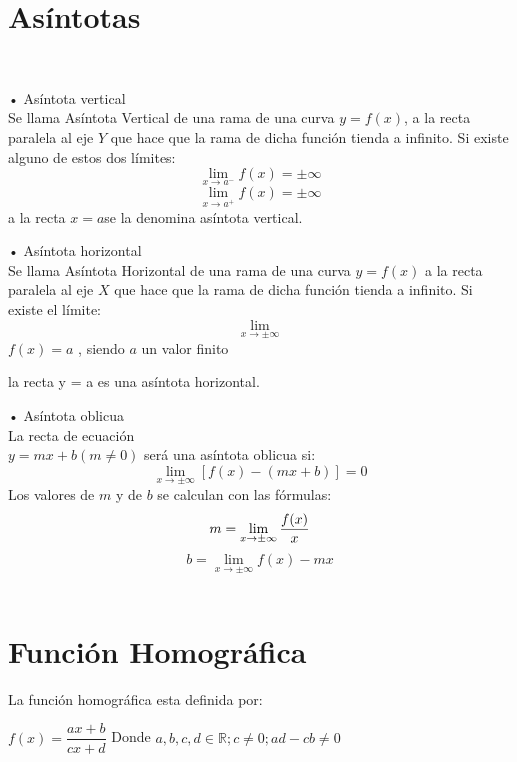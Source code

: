 \section{Asíntotas}
\qquad \\
\hfill
\begin{minipage}{.30\textwidth}
• Asíntota vertical\\

Se llama Asíntota Vertical de una rama de una curva $y = f(x)$, a la recta paralela al eje $Y$ que hace que la rama de dicha función tienda a infinito. Si existe alguno de estos dos límites:
$$\lim_{x \to a^-} f(x) = \pm\infty$$
$$\lim_{x \to a^+} f(x) = \pm\infty$$
a la recta $x = a$se la denomina asíntota vertical.

\end{minipage}
\hfill
\begin{minipage}{.30\textwidth}
• Asíntota horizontal\\

Se llama Asíntota Horizontal de una rama de una curva $y = f(x)$ a la recta paralela al eje $X$ que hace que la rama de dicha función tienda a infinito. Si existe el límite:
$$\lim_{x \to \pm\infty}$$
$f(x)= a$ , siendo $a$ un valor finito

la recta y = a es una asíntota horizontal.
\\

\end{minipage}
\hfill
\begin{minipage}{.30\textwidth}
• Asíntota oblicua\\

La recta de ecuación \\
 $y = mx + b (m \neq 0)$ será una asíntota oblicua si: 
$$\lim_{x \to \pm\infty}[f(x)-(mx+b)] = 0$$
Los valores de $m$ y de $b$ se calculan con las fórmulas: \\
$$m = \lim_{x \to \pm\infty}{f(x) \over x}$$
$$b = \lim_{x \to \pm\infty}{f(x)-mx}$$
\\

\end{minipage}
\hfill


\section{Función Homográfica}

La función homográfica esta definida por:

\begin{center}
$f(x)= \dfrac{ax+b}{cx+d}$ \qquad
Donde $a, b, c, d \in \mathbb{R}; c \neq 0 ; ad-cb \neq 0$
\end{center}

